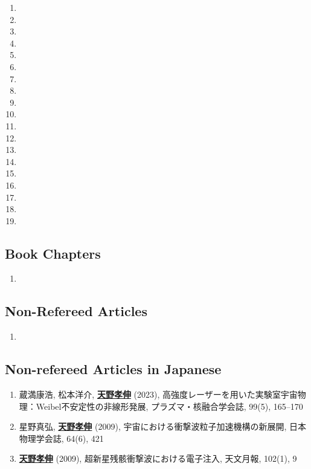 \documentclass[lualatex,a4paper,ja=standard]{scrartcl}
\newcommand{\NewSubPart}[1]{\subsection*{#1}}
\newcommand{\self}[1]{\textbf{\underline{#1}}}
\begin{document}
\begin{enumerate}
	\item {} 
	\item {} 
	\item {} 
	\item {} 
	\item {} 
	\item {} 
	\item {} 
	\item {} 
	\item {} 
	\item {} 
	\item {} 
	\item {} 
	\item {} 
	\item {} 
	\item {} 
	\item {} 
	\item {} 
	\item {} 
	\item {} 
\end{enumerate}

\NewSubPart{Book Chapters}
\begin{enumerate}
	\item {}
\end{enumerate}

\NewSubPart{Non-Refereed Articles}
\begin{enumerate}
	\item {}
\end{enumerate}

\NewSubPart{Non-refereed Articles in Japanese}
\begin{enumerate}
	\item 蔵満康浩, 松本洋介, \self{天野孝伸} (2023), 高強度レーザーを用いた実験室宇宙物理：Weibel不安定性の非線形発展, プラズマ・核融合学会誌, 99(5), 165--170
	\item 星野真弘, \self{天野孝伸} (2009), 宇宙における衝撃波粒子加速機構の新展開, 日本物理学会誌, 64(6), 421
	\item \self{天野孝伸} (2009), 超新星残骸衝撃波における電子注入, 天文月報, 102(1), 9
\end{enumerate}
\end{document}
